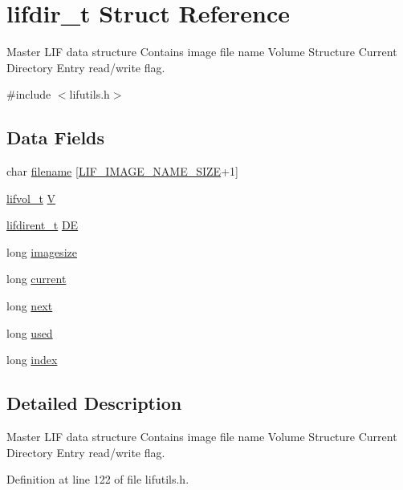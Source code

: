 \hypertarget{structlifdir__t}{}\section{lifdir\+\_\+t Struct Reference}
\label{structlifdir__t}


Master L\+IF data structure Contains image file name Volume Structure Current Directory Entry read/write flag.  




{\ttfamily \#include $<$lifutils.\+h$>$}

\subsection*{Data Fields}
\begin{DoxyCompactItemize}
\item 
char \hyperlink{structlifdir__t_a21bfa7a6d54009982cc63962951ba615}{filename} \mbox{[}\hyperlink{lifutils_8h_a8cfa79b094fc3a5db37b26761a639e6d}{L\+I\+F\+\_\+\+I\+M\+A\+G\+E\+\_\+\+N\+A\+M\+E\+\_\+\+S\+I\+ZE}+1\mbox{]}
\item 
\hyperlink{structlifvol__t}{lifvol\+\_\+t} \hyperlink{structlifdir__t_a6d9cb52ec6e3ff579ca3f45db9176ce9}{V}
\item 
\hyperlink{structlifdirent__t}{lifdirent\+\_\+t} \hyperlink{structlifdir__t_af9247c1579ce3fe0c57db9fd6b56c232}{DE}
\item 
long \hyperlink{structlifdir__t_a2cae1515444f013eaf439333e3952b1d}{imagesize}
\item 
long \hyperlink{structlifdir__t_a662534fa317565f8f6992515e1eb39c4}{current}
\item 
long \hyperlink{structlifdir__t_a52a7520a6393d4782afb0ccd42899215}{next}
\item 
long \hyperlink{structlifdir__t_a20f303d91cccc01286974be1ee064a8f}{used}
\item 
long \hyperlink{structlifdir__t_a7b9b45ee1a56ba386158da051605a8bd}{index}
\end{DoxyCompactItemize}


\subsection{Detailed Description}
Master L\+IF data structure Contains image file name Volume Structure Current Directory Entry read/write flag. 

Definition at line 122 of file lifutils.\+h.



